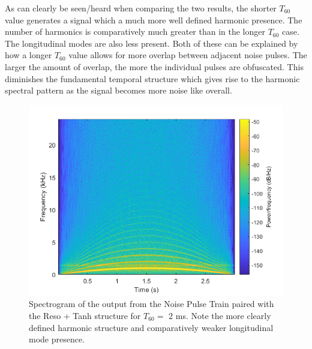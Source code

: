 \documentclass[../main.tex]{subfiles}
\begin{document}
As can clearly be seen/heard when comparing the two results, the shorter $T_{60}$ value generates a signal which a much more well defined harmonic presence. The number of harmonics is comparatively much greater than in the longer $T_{60}$ case. The longitudinal modes are also less present. Both of these can be explained by how a longer $T_{60}$ value allows for more overlap between adjacent noise pulses. The larger the amount of overlap, the more the individual pulses are obfuscated. This diminishes the fundamental temporal structure which gives rise to the harmonic spectral pattern as the signal becomes more noise like overall.

\begin{figure}[!]
    \centering
    \includegraphics[scale=.60]{./images/plots/NPTResoTanhT60Short.png}
    \caption{Spectrogram of the output from the Noise Pulse Train paired with the Reso + Tanh structure for $T_{60} = $ 2 ms. Note the more clearly defined harmonic structure and comparatively weaker longitudinal mode presence.}
    \label{fig:NPT_RT_T60_Short}
\end{figure}
\end{document}
